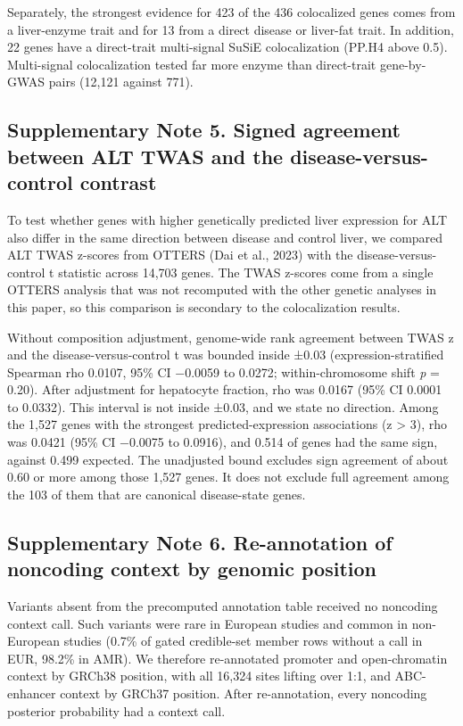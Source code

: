 Separately, the strongest evidence for 423 of the 436 colocalized genes comes from a liver-enzyme trait and for 13 from a direct disease or liver-fat trait. In addition, 22 genes have a direct-trait multi-signal SuSiE colocalization (PP.H4 above 0.5). Multi-signal colocalization tested far more enzyme than direct-trait gene-by-GWAS pairs (12,121 against 771).

\subsection{Supplementary Note 5. Signed agreement between ALT TWAS and the disease-versus-control contrast}\label{supplementary-note-5.-signed-agreement-between-alt-twas-and-the-disease-versus-control-contrast}

To test whether genes with higher genetically predicted liver expression for ALT also differ in the same direction between disease and control liver, we compared ALT TWAS z-scores from OTTERS (Dai et al., 2023) with the disease-versus-control t statistic across 14,703 genes. The TWAS z-scores come from a single OTTERS analysis that was not recomputed with the other genetic analyses in this paper, so this comparison is secondary to the colocalization results.

Without composition adjustment, genome-wide rank agreement between TWAS z and the disease-versus-control t was bounded inside ±0.03 (expression-stratified Spearman rho 0.0107, 95\% CI −0.0059 to 0.0272; within-chromosome shift \emph{p} = 0.20). After adjustment for hepatocyte fraction, rho was 0.0167 (95\% CI 0.0001 to 0.0332). This interval is not inside ±0.03, and we state no direction. Among the 1,527 genes with the strongest predicted-expression associations (\textbar z\textbar{} \textgreater{} 3), rho was 0.0421 (95\% CI −0.0075 to 0.0916), and 0.514 of genes had the same sign, against 0.499 expected. The unadjusted bound excludes sign agreement of about 0.60 or more among those 1,527 genes. It does not exclude full agreement among the 103 of them that are canonical disease-state genes.

\subsection{Supplementary Note 6. Re-annotation of noncoding context by genomic position}\label{supplementary-note-6.-re-annotation-of-noncoding-context-by-genomic-position}

Variants absent from the precomputed annotation table received no noncoding context call. Such variants were rare in European studies and common in non-European studies (0.7\% of gated credible-set member rows without a call in EUR, 98.2\% in AMR). We therefore re-annotated promoter and open-chromatin context by GRCh38 position, with all 16,324 sites lifting over 1:1, and ABC-enhancer context by GRCh37 position. After re-annotation, every noncoding posterior probability had a context call.


